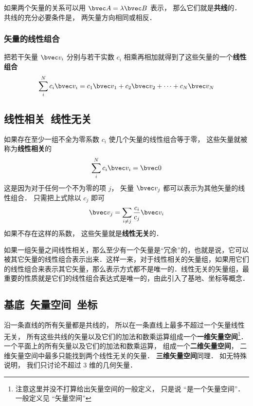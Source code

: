 如果两个矢量的关系可以用 $\bvec A = \lambda\bvec B$ 表示， 那么它们就是\textbf{共线}的． 共线的充分必要条件是， 两矢量方向相同或相反．

\subsubsection{矢量的线性组合}
把若干矢量 $\bvec v_i$ 分别与若干实数 $c_i$ 相乘再相加就得到了这些矢量的一个\textbf{线性组合}
\begin{equation}\label{GVec_eq1}
\sum_i^N c_i \bvec v_i = c_1\bvec v_1 + c_2\bvec v_2 +\dots +c_N \bvec v_N
\end{equation}

\subsection{线性相关\ 线性无关}
如果存在至少一组不全为零系数 $c_i$ 使几个矢量的线性组合等于零， 这些矢量就被称为\textbf{线性相关}的
\begin{equation}\label{GVec_eq2}
\sum_i^N c_i \bvec v_i = \bvec 0
\end{equation}
这是因为对于任何一个不为零的项 $j$， 矢量 $\bvec v_j$ 都可以表示为其他矢量的线性组合． 只需把上式除以 $c_j$ 即可
\begin{equation}\label{GVec_eq3}
\bvec v_j = \sum_{i \ne j}\frac{c_i}{c_j} \bvec v_i
\end{equation}
如果不存在这样的系数， 这些矢量就是\textbf{线性无关}的． 

如果一组矢量之间线性相关，那么至少有一个矢量是“冗余”的，也就是说，它可以被其它矢量的线性组合表示出来．这样一来，对于线性相关的矢量组，如果用它们的线性组合来表示其它矢量，那么表示方式都不是唯一的．线性无关的矢量组，最重要的性质就是它们的线性组合表达式是唯一的，由此引入了基地、坐标等概念．

\subsection{基底\ 矢量空间\ 坐标}
沿一条直线的所有矢量都是共线的， 所以在一条直线上最多不超过一个矢量线性无关， 所有这些共线的矢量以及它们的加法和数乘运算组成一个\textbf{一维矢量空间}\footnote{注意这里并没不打算给出矢量空间的一般定义， 只是说 “是一个矢量空间”． 一般定义见 “矢量空间”}． 一个平面上的所有矢量以及它们的加法和数乘运算， 组成一个\textbf{二维矢量空间}， 二维矢量空间中最多只能找到两个线性无关的矢量． \textbf{三维矢量空间}同理． 如无特殊说明， 我们只讨论不超过 3 维的几何矢量．

